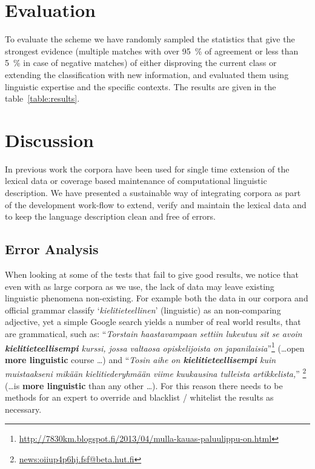 \documentclass[a5paper]{article}
\begin{document}
\section{Evaluation}

To evaluate the scheme we have randomly sampled the statistics that give the
strongest evidence (multiple matches with over 95~\% of agreement or less than 
5~\% in case of negative matches) of either
disproving the current class or extending the classification with new
information, and evaluated them using linguistic expertise and the specific
contexts. The results are given in the table~\ref{table:results}.

\section{Discussion}

In previous work the corpora have been used for single time extension of the
lexical data or coverage based maintenance of computational linguistic
description. We have presented a sustainable way of integrating corpora as part
of the development work-flow to extend, verify and maintain the lexical data
and to keep the language description clean and free of errors.

\subsection{Error Analysis}

When looking at some of the tests that fail to give good results, we notice
that even with as large corpora as we use, the lack of data may leave existing
linguistic phenomena non-existing. For example both the data in our corpora and
official grammar classify `\emph{kielitieteellinen}' (linguistic) as an
non-comparing adjective, yet a simple Google search yields a number of real
world results, that are grammatical, such as: ``\emph{Torstain haastavampaan
    settiin lukeutuu sit se avoin \textbf{kielitieteellisempi} kurssi, jossa
valtaosa opiskelijoista on
japanilaisia}''\footnote{\url{http://7830km.blogspot.fi/2013/04/mulla-kauas-paluulippu-on.html}}
(\ldots open \textbf{more linguistic} course \ldots) and ``\emph{Tosin aihe on
\textbf{kielitieteellisempi} kuin muistaakseni mikään kielitiederyhmään viime
kuukausina tulleista artikkelista,}''
\footnote{\url{news:oiiup4p6hj.fsf@beta.hut.fi}} (\ldots is \textbf{more
linguistic} than any other \ldots). For this reason there needs to be methods
for an expert to override and blacklist / whitelist the results as necessary.
\end{document}
